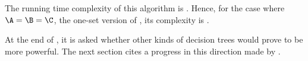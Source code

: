 The running time complexity of this algorithm is
\BigO{\card{\C}(\card{\A}+\card{\B})}. Hence, for the case where $\A = \B =
\C$, \ie the one-set version of \threeSUM, its complexity is .

At the end of \cite{erickson:1999}, it is asked whether other kinds of
decision trees would prove to be more powerful. The next section cites a
progress in this direction made by \citet*{ailon:2005}.
